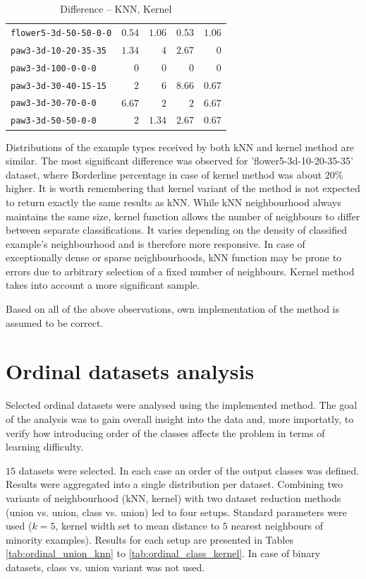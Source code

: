 \documentclass[12pt]{article}
\begin{document}
\begin{table}[H]
\begin{minipage}{0.5\textwidth}
\begin{tabular}{lrrrr}
    \texttt{flower5-3d-50-50-0-0} & $0.54$ & $1.06$ & $0.53$ & $1.06$ \\
    \texttt{paw3-3d-10-20-35-35} & $1.34$ & $4$ & $2.67$ & $0$ \\
    \texttt{paw3-3d-100-0-0-0} & $0$ & $0$ & $0$ & $0$ \\
    \texttt{paw3-3d-30-40-15-15} & $2$ & $6$ & $8.66$ & $0.67$ \\
    \texttt{paw3-3d-30-70-0-0} & $6.67$ & $2$ & $2$ & $6.67$ \\
    \texttt{paw3-3d-50-50-0-0} & $2$ & $1.34$ & $2.67$ & $0.67$ \\
    \bottomrule
\end{tabular}
\caption{Difference -- KNN, Kernel}
\label{tab:knn_kernel_diff}
\end{minipage}
\end{table}

Distributions of the example types received by both kNN and kernel method are similar. The most significant difference was observed for 'flower5-3d-10-20-35-35' dataset, where Borderline percentage in case of kernel method was about $20\%$ higher. It is worth remembering that kernel variant of the method is not expected to return exactly the same results as kNN. While kNN neighbourhood always maintains the same size, kernel function allows the number of neighbours to differ between separate classifications. It varies depending on the density of classified example's neighbourhood and is therefore more responsive. In case of exceptionally dense or sparse neighbourhoods, kNN function may be prone to errors due to arbitrary selection of a fixed number of neighbours. Kernel method takes into account a more significant sample. 

Based on all of the above observations, own implementation of the method is assumed to be correct.

\section{Ordinal datasets analysis}

Selected ordinal datasets were analysed using the implemented method. The goal of the analysis was to gain overall insight into the data and, more importatly, to verify how introducing order of the classes affects the problem in terms of learning difficulty. 

$15$ datasets were selected. In each case an order of the output classes was defined. Results were aggregated into a single distribution per dataset. Combining two variants of neighbourhood (kNN, kernel) with two dataset reduction methods (union vs. union, class vs. union) led to four setups. Standard parameters were used ($k=5$, kernel width set to mean distance to $5$ nearest neighbours of minority examples). Results for each setup are presented in Tables \ref{tab:ordinal_union_knn} to \ref{tab:ordinal_class_kernel}. In case of binary datasets, class vs. union variant was not used. 
\end{document}
